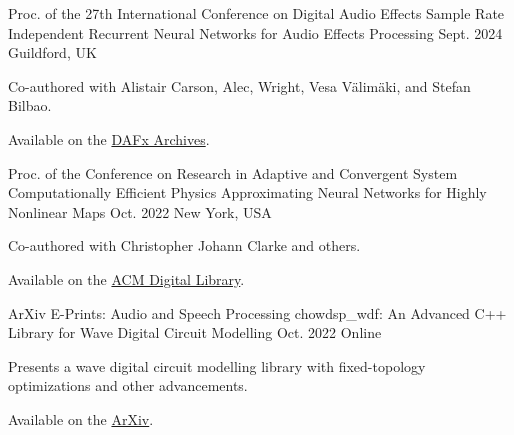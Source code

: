 

\begin{cventries}

  \cventry
    {Proc. of the 27th International Conference on Digital Audio Effects} %
    {Sample Rate Independent Recurrent Neural Networks for Audio Effects Processing} %
    {Sept. 2024} %
    {Guildford, UK} %
    {
      \begin{cvitems} %
        \item {Co-authored with Alistair Carson, Alec, Wright, Vesa Välimäki, and Stefan Bilbao.}
        \item {Available on the \href{https://www.dafx.de/paper-archive/2024/papers/DAFx24_paper_68.pdf}{DAFx Archives}.}
      \end{cvitems}
    }

  \cventry
    {Proc. of the Conference on Research in Adaptive and Convergent System} %
    {Computationally Efficient Physics Approximating Neural Networks for Highly Nonlinear Maps} %
    {Oct. 2022} %
    {New York, USA} %
    {
      \begin{cvitems} %
        \item {Co-authored with Christopher Johann Clarke and others.}
        \item {Available on the \href{https://dl.acm.org/doi/10.1145/3538641.3561501}{ACM Digital Library}.}
      \end{cvitems}
    }

  \cventry
    {ArXiv E-Prints: Audio and Speech Processing} %
    {chowdsp\_wdf: An Advanced C++ Library for Wave Digital Circuit Modelling} %
    {Oct. 2022} %
    {Online} %
    {
      \begin{cvitems} %
        \item {Presents a wave digital circuit modelling library with fixed-topology optimizations and other advancements.}
        \item {Available on the \href{https://arxiv.org/abs/2210.12554}{ArXiv}.}
      \end{cvitems}
    }



\end{cventries}
